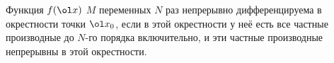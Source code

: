 
	 Функция $f(\ol x)$ $M$ переменных $N$ раз непрерывно дифференцируема в окрестности точки $\ol x_0$,
	 если в этой окрестности у неё есть все частные производные до $N$-го порядка включительно, 
	 и эти частные производные непрерывны в этой окрестности.
	 